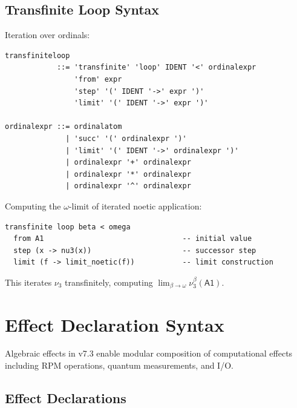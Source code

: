 \subsection{Transfinite Loop Syntax}
\label{subsec:transfinite-loop}

\begin{definition}
\label{def:transfinite-loop-grammar}
Iteration over ordinals:
\begin{lstlisting}[style=bnf,caption={Transfinite Loop Grammar}]
transfiniteloop
            ::= 'transfinite' 'loop' IDENT '<' ordinalexpr
                'from' expr
                'step' '(' IDENT '->' expr ')'
                'limit' '(' IDENT '->' expr ')'

ordinalexpr ::= ordinalatom
              | 'succ' '(' ordinalexpr ')'
              | 'limit' '(' IDENT '->' ordinalexpr ')'
              | ordinalexpr '+' ordinalexpr
              | ordinalexpr '*' ordinalexpr
              | ordinalexpr '^' ordinalexpr
\end{lstlisting}
\end{definition}

\begin{example}
\label{ex:transfinite-loop}
Computing the $\omega$-limit of iterated noetic application:
\begin{verbatim}
transfinite loop beta < omega
  from A1                                -- initial value
  step (x -> nu3(x))                     -- successor step
  limit (f -> limit_noetic(f))           -- limit construction
\end{verbatim}
This iterates $\nu_3$ transfinitely, computing $\lim_{\beta \to \omega} \nu_3^\beta(\mathsf{A1})$.
\end{example}

\section{Effect Declaration Syntax}
\label{sec:effect-declaration-syntax}

Algebraic effects in v7.3 enable modular composition of computational effects including RPM operations, quantum measurements, and I/O.

\subsection{Effect Declarations}
\label{subsec:effect-decl}

